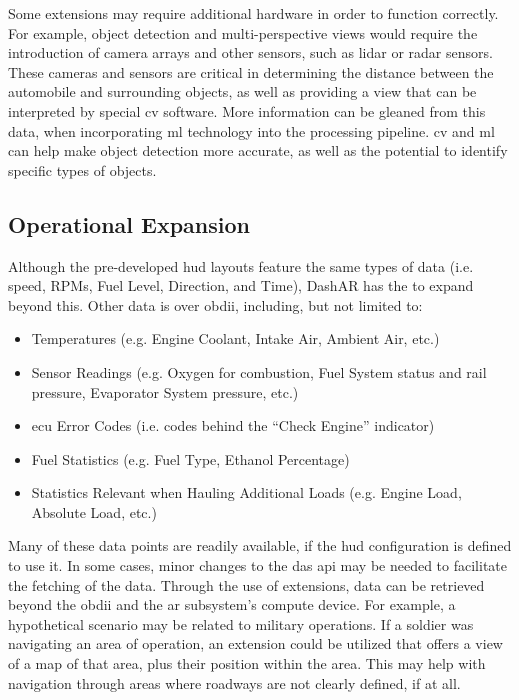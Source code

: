         \par Some extensions may require additional hardware in order to function correctly. For example, object detection and  multi-perspective views would require the introduction of camera arrays and other sensors, such as \gls{lidar} or \gls{radar} sensors. These cameras and sensors are critical in determining the distance between the automobile and surrounding objects, as well as providing a view that can be interpreted by special \gls{cv} software. More information can be gleaned from this data, when incorporating \gls{ml} technology into the processing pipeline. \gls{cv} and \gls{ml} can help make object detection more accurate, as well as the potential to identify specific types of objects.

    \subsection{Operational Expansion}
        \par Although the pre-developed \gls{hud} layouts feature the same types of data (i.e. speed, RPMs, Fuel Level, Direction, and Time), DashAR has the to expand beyond this. Other data is over \gls{obdii}, including, but not limited to:

        \begin{itemize}
            \item Temperatures (e.g. Engine Coolant, Intake Air, Ambient Air, etc.)
            \item Sensor Readings (e.g. Oxygen for combustion, Fuel System status and rail pressure, Evaporator System pressure, etc.)
            \item \gls{ecu} Error Codes (i.e. codes behind the ``Check Engine'' indicator)
            \item Fuel Statistics (e.g. Fuel Type, Ethanol Percentage)
            \item Statistics Relevant when Hauling Additional Loads (e.g. Engine Load, Absolute Load, etc.)
        \end{itemize}

        \par Many of these data points are readily available, if the \gls{hud} configuration is defined to use it. In some cases, minor changes to the \gls{das} \gls{api} may be needed to facilitate the fetching of the data. Through the use of extensions, data can be retrieved beyond the \gls{obdii} and the \gls{ar} subsystem's compute device. For example, a hypothetical scenario may be related to military operations. If a soldier was navigating an area of operation, an extension could be utilized that offers a view of a map of that area, plus their position within the area. This may help with navigation through areas where roadways are not clearly defined, if at all.

